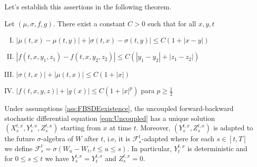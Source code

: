 Let's establish this assertions in the following theorem. 


\begin{assumptions}
	\label{ass:FBSDEexistence}
	Let $(\mu,\sigma,f,g)$. There exist a constant $C>0$ such that for all $x,y,t$
	\begin{enumerate}[I.]
		\item $|\mu(t,x)-\mu(t,y)|+|\sigma(t,x)-\sigma(t,y)|\leq C(1+|x-y|)$
		\item $|f(t,x,y_1,z_1)-f(t,x,y_2,z_2)|\leq C(|y_1-y_2|+|z_1-z_2|)$
		\item $|\sigma(t,x)|+|\mu(t,x)|\leq C(1+|x|)$
		\item $|f(t,x,y,z)|+|g(x)|\leq C(1+|x|^p)$ para $p\geq\frac{1}{2}$
	\end{enumerate}
\end{assumptions}
\begin{theorem}
	Under assumptions \ref{ass:FBSDEexistence}, the uncoupled forward-backward stochastic differential equation \eqref{eqn:Uncoupled} has a unique solution $(X_{s}^{t,x},Y_{s}^{t,x},Z_{s}^{t,x})$ starting from $x$ at time $t$. Moreover, $(Y_{s}^{t,x},Z_{s}^{t,x})$ is adapted to the future $\sigma$-algebra of $W$ after $t$, i.e, it is $\mathcal{F}_{s}^{t}$-adapted where for each $s\in[t,T]$ we define $\mathcal{F}_{s}^{t}=\sigma(W_u-W_t,t\leq u\leq s)$. In particular, $Y_{t}^{t,x}$ is deterministic and for $0\leq s\leq t$ we have $Y_{s}^{t,x}=Y_{t}^{t,x}$ and $Z_{s}^{t,x}=0$.
\end{theorem}
